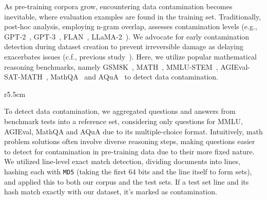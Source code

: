 As pre-training corpora grow, encountering data contamination becomes inevitable, where evaluation examples are found in the training set. Traditionally, post-hoc analysis, employing n-gram overlap, assesses contamination levels (e.g., GPT-2~\citep{radford2019gpt-2}, GPT-3~\citep{DBLP:conf/nips/BrownMRSKDNSSAA20-gpt-3}, FLAN~\citep{DBLP:conf/iclr/WeiBZGYLDDL22-FLAN}, LLaMA-2~\citep{DBLP:journals/corr/abs-2307-09288-llama-2}).  We advocate for early contamination detection during dataset creation to prevent irreversible damage as delaying exacerbates issues (c.f., previous study~\citep{DBLP:journals/corr/abs-2211-15533-stack}). Here, we utilize popular mathematical reasoning benchmarks, namely GSM8K~\citep{DBLP:journals/corr/abs-2110-14168-GSM8K}, MATH~\citep{DBLP:conf/nips/HendrycksBKABTS21-math}, MMLU-STEM~\citep{DBLP:conf/iclr/HendrycksBBZMSS21-MMLU}, AGIEval-SAT-MATH~\citep{DBLP:journals/corr/abs-2304-06364-agieval}, MathQA~\citep{DBLP:conf/naacl/AminiGLKCH19-mathqa} and AQuA~\citep{ling-etal-2017-program-aqua} to detect data contamination. 

\begin{wraptable}{r}{5.5cm}
\caption{Benchmark test set occurrences in pre-training corpora, with numbers representing minimum occurrences, given potential undetected duplicates.
}
\label{tab:data-contamination-stat}

\end{wraptable}To detect data contamination, we aggregated questions and answers from benchmark tests into a reference set, considering only questions for MMLU, AGIEval, MathQA and AQuA due to its multiple-choice format. Intuitively, math problem solutions often involve diverse reasoning steps, making questions easier to detect for contamination in pre-training data due to their more fixed nature. We utilized line-level exact match detection, dividing documents into lines, hashing each with \texttt{MD5} (taking the first 64 bits and the line itself to form sets), and applied this to both our corpus and the test sets. If a test set line and its hash match exactly with our dataset, it's marked as contamination.

